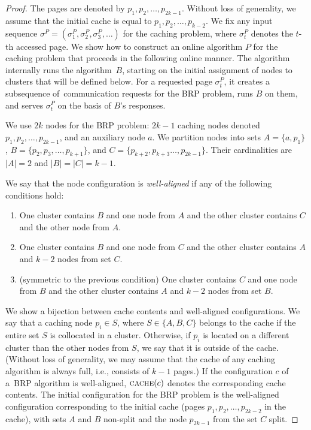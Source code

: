\documentclass[manuscript,screen=true, review, anonymous]{acmart}
\begin{document}
\begin{proof}
  The pages are denoted by $p_1,p_2,\ldots,p_{2k-1}$. Without loss of generality, we assume that the initial cache is equal to $p_1,p_2,\ldots,p_{k-2}$.
  We fix any input sequence $\sigma^P = (\sigma^P_1, \sigma^P_2, \sigma^P_3, \ldots)$ for the caching problem, where $\sigma^P_t$ denotes the $t$-th accessed page.
  We show how to construct an online algorithm $P$ for the caching problem that proceeds in the following online manner.
  The algorithm internally runs the algorithm~$B$, starting on the initial assignment of nodes to clusters that will be defined below.
  For a requested page $\sigma^P_t$, it creates a subsequence of~communication requests for the BRP problem, runs $B$ on them, and serves $\sigma^P_t$ on the basis of $B$'s responses.

  We use $2k$ nodes for the BRP problem: $2k-1$ caching nodes denoted $p_1,p_2, \ldots, p_{2k-1}$, and an auxiliary node $a$.
  We partition nodes into sets $A = \{ a, p_1 \}$, $B = \{ p_2, p_3, \ldots, p_{k+1}\}$, and $C = \{ p_{k+2}, p_{k+3} \ldots, p_{2k-1}\}$.
  Their cardinalities are $|A| = 2$ and $|B| = |C| = k-1$.

  We say that the node configuration is \emph{well-aligned} if any of the following conditions hold:
  \begin{enumerate}
    \item One cluster contains $B$ and one node from $A$ and the other cluster contains $C$ and the other node from $A$.
    \item One cluster contains $B$ and one node from $C$ and the other cluster contains $A$ and $k-2$ nodes from set $C$.
    \item (symmetric to the previous condition) One cluster contains $C$ and one node from $B$ and the other cluster contains $A$ and $k-2$ nodes from set $B$.
  \end{enumerate}
  We show a bijection between cache contents and well-aligned configurations.
  We say that a caching node $p_i \in S$, where $S \in \{ A, B, C\}$ belongs to the cache if the entire set $S$ is collocated in a cluster.
  Otherwise, if $p_i$ is located on a different cluster than the other nodes from $S$, we say that it is outside of the cache.
  (Without loss of generality, we may assume that the cache of any caching algorithm is always full, i.e., consists of $k-1$ pages.)
  If the configuration $c$ of a~BRP algorithm is well-aligned, $\textsc{cache}(c)$ denotes the corresponding cache contents.
  The initial configuration for the BRP problem is the well-aligned configuration corresponding to the initial cache (pages $p_1,p_2,\ldots,p_{2k-2}$ in the cache), with sets $A$ and $B$ non-split and the node $p_{2k-1}$ from the set $C$ split.


\end{proof}
\end{document}

